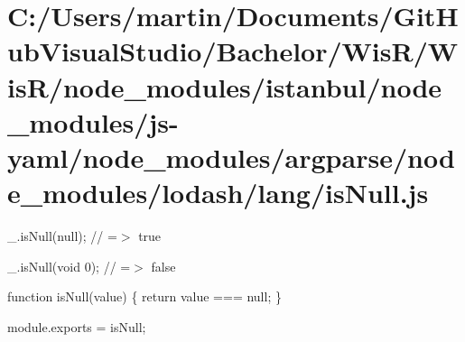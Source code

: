 \hypertarget{_c_1_2_users_2martin_2_documents_2_git_hub_visual_studio_2_bachelor_2_wis_r_2_wis_r_2node_modulea89b11259e594c041ce7ef87e5ed380a}{}\section{C\+:/\+Users/martin/\+Documents/\+Git\+Hub\+Visual\+Studio/\+Bachelor/\+Wis\+R/\+Wis\+R/node\+\_\+modules/istanbul/node\+\_\+modules/js-\/yaml/node\+\_\+modules/argparse/node\+\_\+modules/lodash/lang/is\+Null.\+js}
\+\_\+.\+is\+Null(null); // =$>$ true

\+\_\+.\+is\+Null(void 0); // =$>$ false


\begin{DoxyCodeInclude}

\textcolor{keyword}{function} isNull(value) \{
  \textcolor{keywordflow}{return} value === null;
\}

module.exports = isNull;
\end{DoxyCodeInclude}
 